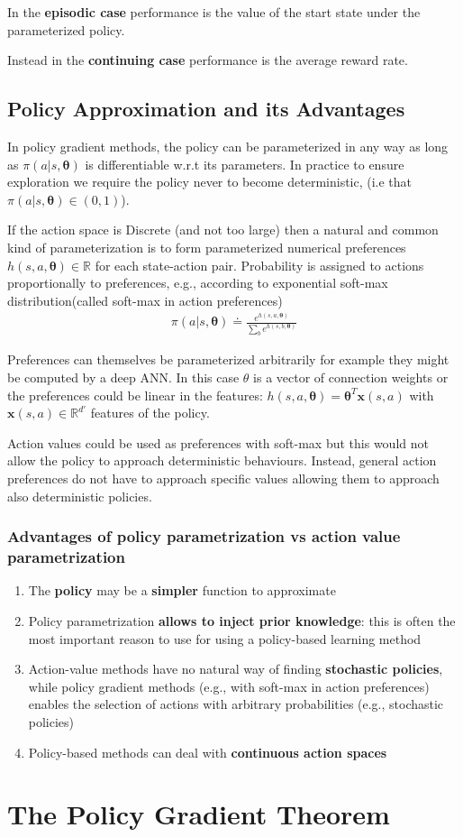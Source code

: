 In the \textbf{episodic case} performance is the value of the start state under the parameterized policy.

Instead in the \textbf{continuing case} performance is the average reward rate.

\subsection{Policy Approximation and its Advantages}
In policy gradient methods, the policy can be parameterized in any way as long as $\pi(a|s, \bm{\theta})$ is differentiable w.r.t its parameters. In practice to ensure exploration we require the policy never to become deterministic, (i.e that $\pi(a|s, \bm{\theta})\in(0,1)$).

If the action space is Discrete (and not too large) then a natural and common kind of parameterization is to form parameterized numerical preferences $h(s,a,\bm{\theta})\in\mathbb{R}$ for each state-action pair.
Probability is assigned to actions proportionally to preferences, e.g., according to exponential soft-max distribution(called soft-max in action preferences)
    \begin{align*}
         \pi(a|s, \bm{\theta})\doteq\frac{e^{h(s,a,\bm{\theta})}}{\sum_b e^{h(s,b,\bm{\theta})}}
    \end{align*}

Preferences can themselves be parameterized arbitrarily for example they might be computed by a deep ANN. In this case $\theta$ is a vector of connection weights or the preferences could be linear in the features: $h(s,a,\bm{\theta})=\bm{\theta}^T\bm{x}(s,a)$ with $\bm{x}(s,a)\in \mathbb{R}^{d'}$ features of the policy.

Action values could be used as preferences with soft-max but this would not allow the policy to approach deterministic behaviours. Instead, general action preferences do not have to approach specific values allowing them to approach also deterministic policies.

\subsubsection{Advantages of policy parametrization vs action value parametrization}
\begin{enumerate}
    \item The \textbf{policy} may be a \textbf{simpler} function to approximate
    \item Policy parametrization \textbf{allows to inject prior knowledge}: this is often the most important reason to use for using a policy-based learning method
    \item Action-value methods have no natural way of finding \textbf{stochastic policies}, while policy gradient methods (e.g., with soft-max in action preferences) enables the selection of actions with arbitrary probabilities (e.g., stochastic policies)
    \item Policy-based methods can deal with \textbf{continuous action spaces}
\end{enumerate}

\section{The Policy Gradient Theorem}

